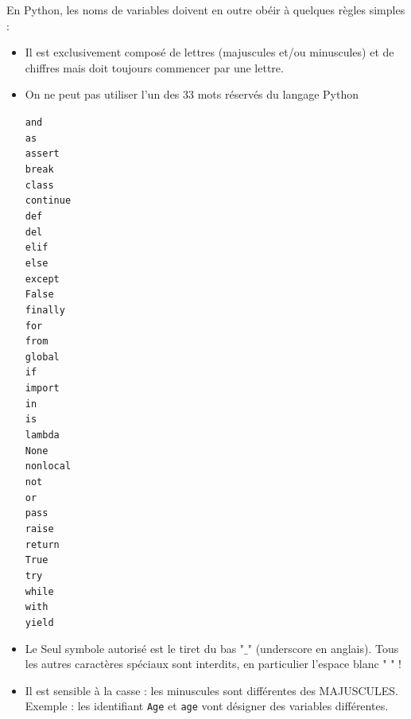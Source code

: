 \documentclass[11pt, a4paper]{book}
\begin{document}
\begin{important}
	En Python, les noms de variables doivent en outre obéir à quelques règles simples :\\
	\begin{itemize}
		\item Il est exclusivement composé de lettres (majuscules  et/ou minuscules) et de chiffres mais doit toujours	commencer par une lettre.
		\item On ne peut pas utiliser l’un des 33 mots réservés du langage Python
		\begin{multicols}{7}
			\lstinline{and}\\      \lstinline{as}\\         \lstinline{assert}\\      \lstinline{break}\\       \lstinline{class}\\       \lstinline{continue}\\       \lstinline{def}\\
			\lstinline{del}\\       \lstinline{elif}\\       \lstinline{else}\\        \lstinline{except}\\      \lstinline{False}\\       \lstinline{finally}\\        \lstinline{for}\\
			\lstinline{from}\\      \lstinline{global}\\     \lstinline{if}\\          \lstinline{import}\\      \lstinline{in}\\          \lstinline{is}\\             \lstinline{lambda}\\
			\lstinline{None}\\      \lstinline{nonlocal}\\   \lstinline{not}\\         \lstinline{or}\\          \lstinline{pass}\\        \lstinline{raise}\\          \lstinline{return}\\
			\lstinline{True}\\      \lstinline{try}\\        \lstinline{while}\\     \lstinline{with}\\ \lstinline{yield}
		\end{multicols}	
		\item Le Seul symbole autorisé est le tiret du bas "$\_$" (underscore en anglais).
		Tous les autres caractères spéciaux sont interdits, en particulier l’espace blanc " " !
		\item Il est sensible à la casse : les minuscules sont différentes des MAJUSCULES. Exemple : les identifiant \lstinline{Age} et \lstinline{age} vont désigner des variables différentes.
	\end{itemize}
\end{important}
\end{document}
